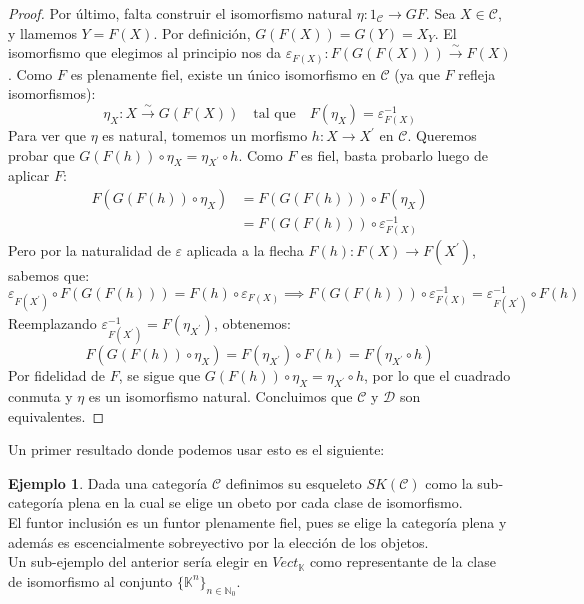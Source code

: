 \documentclass{article}
\newcommand{\nat}{\ensuremath{\mathbb{N}}}
\newcommand{\conjunto}[1]{\ensuremath{\{#1\}}}
\newcommand{\cuerpo}{\mathbb{K}}
\theoremstyle{plain}
\theoremstyle{definition}
\newtheorem{ejemplo}[theorem]{Ejemplo}
\theoremstyle{remark}
\begin{document}
\begin{proof}
    Por último, falta construir el isomorfismo natural $\eta: 1_{\mathcal{C}} \to GF$. Sea $X \in \mathcal{C}$, y llamemos $Y = F(X)$. Por definición, $G(F(X)) = G(Y) = X_Y$. El isomorfismo que elegimos al principio nos da $\varepsilon_{F(X)}: F(G(F(X))) \xrightarrow{\sim} F(X)$.
    Como $F$ es plenamente fiel, existe un único isomorfismo en $\mathcal{C}$ (ya que $F$ refleja isomorfismos):
    \begin{equation*}
        \eta_X: X \xrightarrow{\sim} G(F(X)) \quad \text{tal que} \quad F(\eta_X) = \varepsilon_{F(X)}^{-1}
    \end{equation*}
    Para ver que $\eta$ es natural, tomemos un morfismo $h: X \to X^\prime$ en $\mathcal{C}$. Queremos probar que $G(F(h)) \circ \eta_X = \eta_{X^\prime} \circ h$. Como $F$ es fiel, basta probarlo luego de aplicar $F$:
    \begin{align*}
        F(G(F(h)) \circ \eta_X) &= F(G(F(h))) \circ F(\eta_X) \\
        &= F(G(F(h))) \circ \varepsilon_{F(X)}^{-1}
    \end{align*}
    Pero por la naturalidad de $\varepsilon$ aplicada a la flecha $F(h): F(X) \to F(X^\prime)$, sabemos que:
    \begin{equation*}
        \varepsilon_{F(X^\prime)} \circ F(G(F(h))) = F(h) \circ \varepsilon_{F(X)} \implies F(G(F(h))) \circ \varepsilon_{F(X)}^{-1} = \varepsilon_{F(X^\prime)}^{-1} \circ F(h)
    \end{equation*}
    Reemplazando $\varepsilon_{F(X^\prime)}^{-1} = F(\eta_{X^\prime})$, obtenemos:
    \begin{equation*}
        F(G(F(h)) \circ \eta_X) = F(\eta_{X^\prime}) \circ F(h) = F(\eta_{X^\prime} \circ h)
    \end{equation*}
    Por fidelidad de $F$, se sigue que $G(F(h)) \circ \eta_X = \eta_{X^\prime} \circ h$, por lo que el cuadrado conmuta y $\eta$ es un isomorfismo natural. Concluimos que $\mathcal{C}$ y $\mathcal{D}$ son equivalentes.
\end{proof}

Un primer resultado donde podemos usar esto es el siguiente:

\begin{ejemplo}
    Dada una categoría $\mathcal{C}$ definimos su esqueleto $SK(\mathcal{C})$ como la sub-categoría plena en la cual se elige un obeto por cada clase de isomorfismo. \\

    El funtor inclusión es un funtor plenamente fiel, pues se elige la categoría plena y además es escencialmente sobreyectivo por la elección de los objetos. \\

    Un sub-ejemplo del anterior sería elegir en $Vect_\cuerpo$ como representante de la clase de isomorfismo al conjunto $\conjunto{\cuerpo^n}_{n \in \nat_0}$. 
\end{ejemplo}
\end{document}
